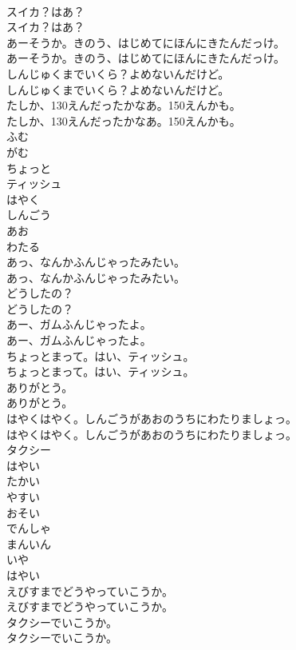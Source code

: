 \documentclass[8pt]{extreport}
\begin{document}
\begin{CJK}{UTF8}{min}
\\	スイカ？はあ？
\\	スイカ？はあ？
\\	あーそうか。きのう、はじめてにほんにきたんだっけ。
\\	あーそうか。きのう、はじめてにほんにきたんだっけ。
\\	しんじゅくまでいくら？よめないんだけど。
\\	しんじゅくまでいくら？よめないんだけど。
\\	たしか、130えんだったかなあ。150えんかも。
\\	たしか、130えんだったかなあ。150えんかも。
\\	ふむ
\\	がむ
\\	ちょっと
\\	ティッシュ
\\	はやく
\\	しんごう
\\	あお
\\	わたる
\\	あっ、なんかふんじゃったみたい。
\\	あっ、なんかふんじゃったみたい。
\\	どうしたの？
\\	どうしたの？
\\	あー、ガムふんじゃったよ。
\\	あー、ガムふんじゃったよ。
\\	ちょっとまって。はい、ティッシュ。
\\	ちょっとまって。はい、ティッシュ。
\\	ありがとう。
\\	ありがとう。
\\	はやくはやく。しんごうがあおのうちにわたりましょっ。
\\	はやくはやく。しんごうがあおのうちにわたりましょっ。
\\	タクシー
\\	はやい
\\	たかい
\\	やすい
\\	おそい
\\	でんしゃ
\\	まんいん
\\	いや
\\	はやい
\\	えびすまでどうやっていこうか。
\\	えびすまでどうやっていこうか。
\\	タクシーでいこうか。
\\	タクシーでいこうか。

\end{CJK}
\end{document}
